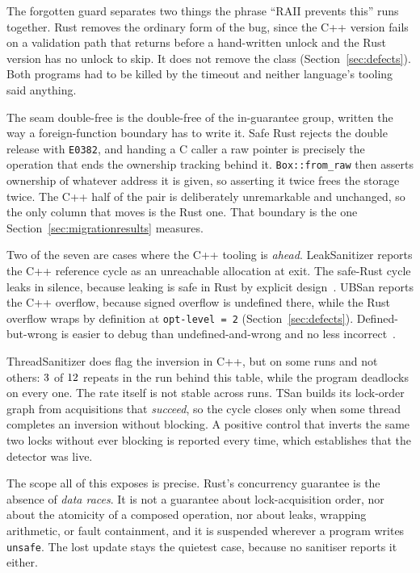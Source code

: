 \documentclass[english,oneside,a4paper,censored,csm,software-track-2020]{HYthesisML}
\begin{document}
The forgotten guard separates two things the phrase ``RAII prevents this'' runs together. Rust
removes the ordinary form of the bug, since the C++ version fails on a validation path that
returns before a hand-written unlock and the Rust version has no unlock to skip. It does not
remove the class (Section~\ref{sec:defects}). Both programs had to be killed by the timeout and
neither language's tooling said anything.

The seam double-free is the double-free of the in-guarantee group, written the way a
foreign-function boundary has to write it. Safe Rust rejects the double release with
\texttt{E0382}, and handing a C caller a raw pointer is precisely the operation that ends the
ownership tracking behind it. \texttt{Box::from\_raw} then asserts ownership of whatever address
it is given, so asserting it twice frees the storage twice. The C++ half of the pair is
deliberately unremarkable and unchanged, so the only column that moves is the Rust one. That
boundary is the one Section~\ref{sec:migrationresults} measures.

Two of the seven are cases where the C++ tooling is \emph{ahead}. LeakSanitizer reports the C++
reference cycle as an unreachable allocation at exit. The safe-Rust cycle leaks in silence,
because leaking is safe in Rust by explicit
design~\cite{hughes2025gcrust,cui2024rcanary}. UBSan reports the C++ overflow, because signed
overflow is undefined there, while the Rust overflow wraps by definition at
\texttt{opt-level~=~2} (Section~\ref{sec:defects}). Defined-but-wrong is easier to debug than
undefined-and-wrong and no less incorrect~\cite{dietz2015overflow}.

ThreadSanitizer does flag the inversion in C++, but on some runs and not others:
$3$ of $12$ repeats in the run behind this table, while the
program deadlocks on every one. The rate itself is not stable across runs. TSan builds its
lock-order graph from acquisitions that \emph{succeed}, so the cycle closes only when some
thread completes an inversion without blocking. A positive control that inverts the same two
locks without ever blocking is reported every time, which establishes that the detector was live.

The scope all of this exposes is precise. Rust's concurrency guarantee is the absence of
\emph{data races}. It is not a guarantee about lock-acquisition order, nor about the atomicity of a
composed operation, nor about leaks, wrapping arithmetic, or fault containment, and it is
suspended wherever a program writes \texttt{unsafe}. The lost update stays the quietest case,
because no sanitiser reports it either.
\end{document}
